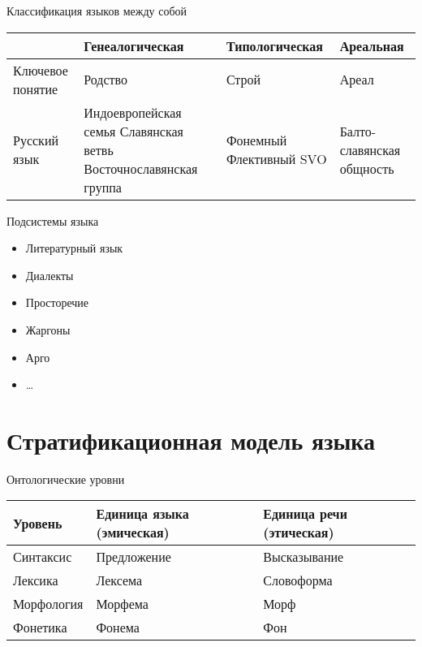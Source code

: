 \begin{frame}{Классификация языков между собой}
    \begin{table}[t]
        \begin{tabularx}{\textwidth}{p{3cm}XXX}
            & Генеалогическая & Типологическая & Ареальная \\ \midrule
            Ключевое понятие & Родство & Строй & Ареал \\ \midrule
            Русский язык
                & Индоевропейская семья \linebreak \mbox{Славянская} ветвь \linebreak Восточнославянская группа
                & Фонемный \linebreak Флективный \linebreak SVO
                & Балто-славянская общность \\ \midrule
        \end{tabularx}
    \end{table}
\end{frame}

\begin{frame}{Подсистемы языка}
    \begin{itemize}
        \item Литературный язык
        \item Диалекты
        \item Просторечие
        \item Жаргоны
        \item Арго
        \item \ldots
    \end{itemize}
\end{frame}

\section{Стратификационная модель языка}

\frame{\tableofcontents}

\begin{frame}{Онтологические уровни}
    \begin{table}[t]
        \begin{tabularx}{\textwidth}{XXX}
            Уровень & Единица языка (эмическая) & Единица речи (этическая) \\ \midrule
            Синтаксис & Предложение & Высказывание \\ \midrule
            Лексика & Лексема & Словоформа \\ \midrule
            Морфология & Морфема & Морф \\ \midrule
            Фонетика & Фонема & Фон \\
        \end{tabularx}
    \end{table}
\end{frame}

